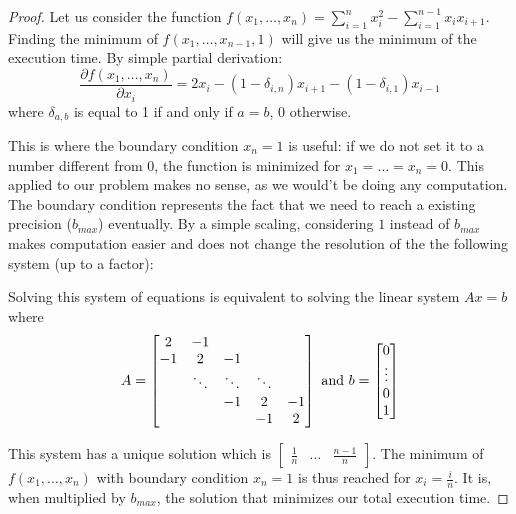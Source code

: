 \documentclass[10pt,conference]{IEEEtran}
\begin{document}
\begin{proof}
   Let us consider the function $f(x_1,\dots,x_n) = \sum\limits_{i=1}^n x_i^2 - \sum\limits_{i=1}^{n-1} x_ix_{i+1}$. Finding the minimum of $f(x_1,\dots,x_{n-1},1)$ will give
   us the minimum of the execution time.
   By simple partial derivation:
   \[ \frac{\partial f(x_1,\dots,x_n)}{\partial x_i} = 2x_i - (1-\delta_{i,n})x_{i+1} - (1-\delta_{i,1})x_{i-1} \]
   where $\delta_{a,b} $ is equal to 1 if and only if $a=b$, 0 otherwise.
   
   This is where the boundary condition $x_n = 1$ is useful: if we do not set it to a number different from 0, the function is minimized for $x_1=\dots=x_n=0$. This applied to our problem
   makes no sense, as we would't be doing any computation. The boundary condition represents the fact that we need to reach a existing precision ($b_{max}$) eventually. By a simple scaling,
   considering $1$ instead of $b_{max}$ makes computation easier and does not change the resolution of the the following system (up to a factor):
   
  
  Solving this system of equations is equivalent to solving the linear system $Ax=b$ where
  \[ A = \begin{bmatrix}
    2       & -1 &  &  &  \\
    -1       & 2 & -1 &  &  \\
    & \ddots & \ddots & \ddots & \\
    & & -1 & 2 & -1 \\
           &  &  & -1 & 2
\end{bmatrix} \textup{ and } b = \begin{bmatrix} 0 \\ \vdots \\ 0 \\ 1 \end{bmatrix} \]
   
   This system has a unique solution which is $\begin{bmatrix} \frac{1}{n} & \dots & \frac{n-1}{n} \end{bmatrix}$.
   The minimum of $f(x_1,\dots,x_n)$ with boundary condition $x_n=1$ is thus reached for $x_i = \frac{i}{n}$.
   It is, when multiplied by $b_{max}$, the solution that minimizes our total execution time.
   \end{proof}
   
\end{document}
